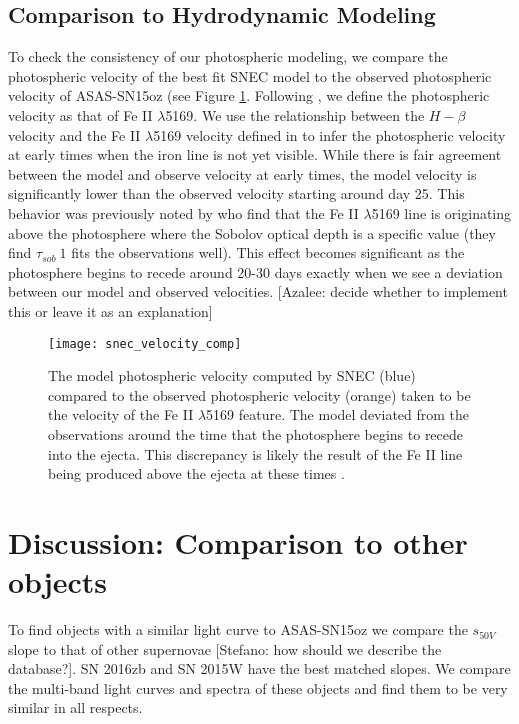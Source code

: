\documentclass[preprint]{aastex61}
\newcommand{\azaleecomment}[1]{{\color{red} [{#1}]}}
\newcommand{\Azalee}[1]{\azaleecomment{Azalee: #1}}
\newcommand{\stefanocomment}[1]{{\color{cyan} [{#1}]}}
\newcommand{\Stefano}[1]{\stefanocomment{Stefano: #1}}
\begin{document}
\subsection{Comparison to Hydrodynamic Modeling}
To check the consistency of our photospheric modeling, we compare the photospheric velocity of the best fit SNEC model to the observed photospheric velocity of ASAS-SN15oz (see Figure \ref{fig:SNECVelocityCompare}.
Following \citet{2014faran}, we define the photospheric velocity as that of Fe II $\lambda$5169. 
We use the relationship between the $H-\beta$ velocity and the Fe II $\lambda$5169 velocity defined in \citet{2014faran} to infer the photospheric velocity at early times when the iron line is not yet visible.
While there is fair agreement between the model and observe velocity at early times, the model velocity is significantly lower than the observed velocity starting around day 25.
This behavior was previously noted by \citet{2018paxton} who find that the Fe II $\lambda$5169 line is originating above the photosphere where the Sobolov optical depth is a specific value (they find $\tau_{sob} ~1$ fits the observations well). 
This effect becomes significant as the photosphere begins to recede around 20-30 days exactly when we see a deviation between our model and observed velocities. 
\Azalee{decide whether to implement this or leave it as an explanation}

\begin{figure}[htbp]
\begin{center}
\texttt{[image: snec\_velocity\_comp]}
\caption{The model photospheric velocity computed by SNEC (blue) compared to the observed photospheric velocity (orange) taken to be the velocity of the Fe II $\lambda$5169 feature. 
The model deviated from the observations around the time that the photosphere begins to recede into the ejecta.
This discrepancy is likely the result of the Fe II line being produced above the ejecta at these times \citep{2018paxton}.
}
\label{fig:SNECVelocityCompare}
\end{center}
\end{figure}


\section{Discussion: Comparison to other objects} 
To find objects with a similar light curve to ASAS-SN15oz we compare the $s_{50V}$ slope to that of other supernovae \Stefano{how should we describe the database?}.
SN 2016zb and SN 2015W have the best matched slopes. We compare the multi-band light curves and spectra of these objects and find them to be very similar in all respects.
\end{document}
